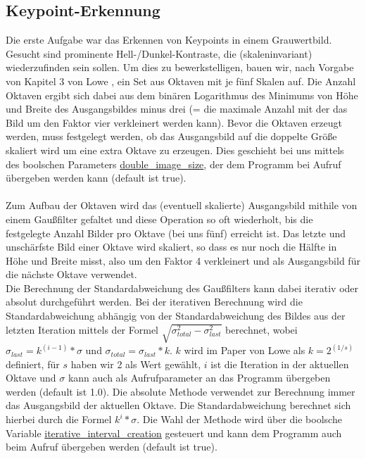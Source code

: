\documentclass[a4paper,12pt]{scrartcl}
\begin{document}
\subsection{Keypoint-Erkennung}
Die erste Aufgabe war das Erkennen von Keypoints in einem Grauwertbild. Gesucht sind 
prominente Hell-/Dunkel-Kontraste, die (skaleninvariant) wiederzufinden sein sollen. Um 
dies zu bewerkstelligen, bauen wir, nach Vorgabe von Kapitel 3 von Lowe \cite{Lowe}, ein 
Set aus Oktaven mit je fünf Skalen auf. Die Anzahl Oktaven ergibt sich dabei aus dem 
binären Logarithmus des Minimums von Höhe und Breite des Ausgangsbildes minus drei (= die 
maximale Anzahl mit der das Bild um den Faktor vier verkleinert werden kann). Bevor die 
Oktaven erzeugt werden, muss festgelegt werden, ob das Ausgangsbild auf die doppelte 
Größe skaliert wird um eine extra Oktave zu erzeugen. Dies geschieht bei uns mittels des 
boolschen Parameters \url{double_image_size}, der dem Programm bei Aufruf übergeben 
werden kann (default ist true). \\ \ \\
Zum Aufbau der Oktaven wird das (eventuell skalierte) Ausgangsbild mithile von einem 
Gaußfilter gefaltet und diese Operation so oft wiederholt, bis die festgelegte Anzahl 
Bilder pro Oktave (bei uns fünf) erreicht ist. Das letzte und unschärfste Bild einer 
Oktave wird skaliert, so dass es nur noch die Hälfte in Höhe und Breite misst, also um 
den Faktor 4 verkleinert und als Ausgangsbild für die nächste Oktave verwendet. \\
Die Berechnung der Standardabweichung des Gaußfilters kann dabei iterativ oder absolut 
durchgeführt werden. Bei der iterativen Berechnung wird die Standardabweichung abhängig 
von der Standardabweichung des Bildes aus der letzten Iteration mittels der Formel 
$\sqrt{\sigma_{total}^2 - \sigma_{last}^2}$ berechnet, wobei $\sigma_{last} = 
k^{(i-1)}*\sigma$ und $\sigma_{total} = \sigma_{last}*k$. $k$ wird im Paper von Lowe als
$k=2^{(1/s)}$ definiert, für $s$ haben wir 2 als Wert gewählt, $i$ ist die Iteration in 
der aktuellen Oktave und $\sigma$ kann auch als Aufrufparameter an das Programm übergeben 
werden (default ist 1.0). Die absolute Methode verwendet zur Berechnung immer das 
Ausgangsbild der aktuellen Oktave. %
Die Standardabweichung berechnet sich hierbei durch die Formel $k^i*\sigma$. Die Wahl der 
Methode wird über die boolsche Variable \url{iterative_interval_creation} gesteuert und 
kann dem Programm auch beim Aufruf übergeben werden (default ist true). \\ \ \\
\end{document}
